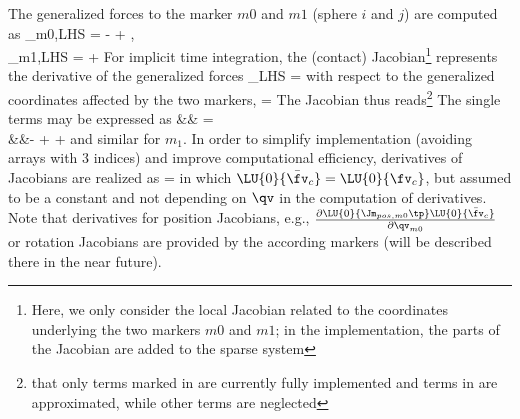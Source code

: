 The generalized forces to the marker $m0$ and $m1$ (sphere $i$ and $j$) are computed as
\bea
  \fv_{m0,LHS} = -  + 
                  , \nonumber \\
  \fv_{m1,LHS} =   + 
                   \eqDot
\eea
%
%
For implicit time integration, the (contact) Jacobian\footnote{Here, we only consider the local Jacobian related to the coordinates underlying the two markers $m0$ and $m1$; in the implementation, the parts of the Jacobian are added to the sparse system } represents the derivative of the generalized forces 
\be
  \fv_{LHS} = 
\ee
with respect to the generalized coordinates affected by the two markers,
\be
  \qv =  \eqDot
\ee
The Jacobian thus reads\footnote{ that only terms marked in  are currently fully implemented and terms in  are approximated, while other terms are neglected}
\be
\ee
The single terms may be expressed as
\bea
  && = \nonumber \\
  &&- 
   
  + 
  + 
  \eqComma
\eea
and similar for $m_1$.
In order to simplify implementation (avoiding arrays with 3 indices) and improve computational efficiency, 
derivatives of Jacobians are realized as
\be
    = 
  \eqComma
\ee
in which $\LU{0}{\bar \fv_c} = \LU{0}{\fv_c}$, but assumed to be a constant and not depending on $\qv$ in the computation of derivatives.
Note that derivatives for position Jacobians, e.g., $\frac{\partial \LU{0}{\Jm_{pos,m0}\tp} \LU{0}{\bar \fv_c}}{\partial \qv_{m0}}$ or rotation
Jacobians are provided by the according markers (will be described there in the near future).

